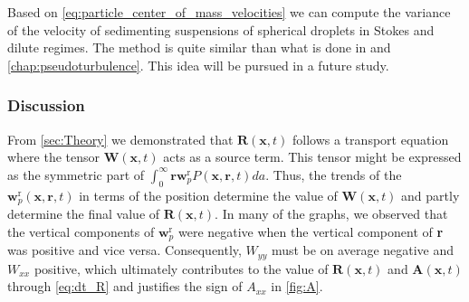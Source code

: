 Based on \ref{eq:particle_center_of_mass_velocities} we can compute the variance of the velocity of sedimenting suspensions of spherical droplets in Stokes and dilute regimes.
The method is quite similar than what is done in \citet{zhang2021ensemble} and \ref{chap:pseudoturbulence}. 
This idea will be pursued in a future study. 

\subsubsection{Discussion}

    

From \ref{sec:Theory} we demonstrated that $\textbf{R}(\textbf{x},t)$ follows a transport equation where the tensor $\textbf{W}(\textbf{x},t)$ acts as a source term. 
This tensor might be expressed as the symmetric part of $\int_0^\infty \textbf{r} \textbf{w}_p^\text{r} P(\textbf{x},\textbf{r},t) da$. 
Thus, the trends of the $\textbf{w}_p^\text{r}(\textbf{x},\textbf{r},t) $ in terms of the position determine the value of $\textbf{W}(\textbf{x},t)$ and partly determine the final value of $\textbf{R}(\textbf{x},t)$. 
In many of the graphs, we observed that the vertical components of $\textbf{w}_p^\text{r}$ were negative when the vertical component of \textbf{r} was positive and vice versa. 
Consequently, $W_{yy}$ must be on average negative and $W_{xx}$ positive, which ultimately contributes to the value of $\textbf{R}(\textbf{x},t)$ and $\textbf{A}(\textbf{x},t)$ through \ref{eq:dt_R} and justifies the sign of $A_{xx}$ in \ref{fig:A}. 

